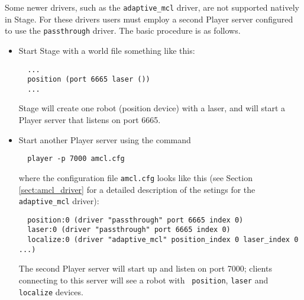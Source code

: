 Some newer drivers, such as the {\tt adaptive\_mcl} driver, are not
supported natively in Stage.  For these drivers users must employ a
second Player server configured to use the {\tt passthrough} driver.
The basic procedure is as follows.
%
\begin{itemize}
\item Start Stage with a world file something like this:
  \begin{verbatim}
  ...
  position (port 6665 laser ())
  ...
  \end{verbatim}
Stage will create one robot (position device) with a laser, and
will start a Player server that listens on port 6665.
\item Start another Player server using the command
  \begin{verbatim}
  player -p 7000 amcl.cfg
  \end{verbatim}
where the configuration file {\tt amcl.cfg} looks like this (see
Section \ref{sect:amcl_driver} for a detailed description of the
setings for the {\tt adaptive\_mcl} driver):
  \begin{verbatim}
  position:0 (driver "passthrough" port 6665 index 0)
  laser:0 (driver "passthrough" port 6665 index 0) 
  localize:0 (driver "adaptive_mcl" position_index 0 laser_index 0 ...)
  \end{verbatim}
The second Player server will start up and listen on port 7000;
clients connecting to this server will see a robot with {\tt
position}, {\tt laser} and {\tt localize} devices.
\end{itemize}




